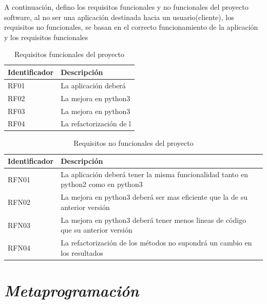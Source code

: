 \documentclass{cosas/tfg_domingo}
\begin{document}
A continuación, defino los requisitos funcionales y no funcionales del proyecto software, al no ser una aplicación destinada hacia un usuario(cliente), los requisitos no funcionales, se basan en el correcto funcionamiento de la aplicación y los requisitos funcionales

\begin{table}[h]
\centering
\begin{tabular}{|l|l|}
\hline
Identificador & Descripción                     \\ \hline
RF01         & La aplicación deberá            \\ \hline
RF02         & La mejora en python3            \\ \hline
RF03         & La mejora en python3            \\ \hline
RF04         & La refactorización de l         \\ \hline
\end{tabular}
\caption{Requisitos funcionales del proyecto}
\label{tab:my-table}
\end{table}

\begin{table}[h]
\centering
\begin{tabular}{|l|l|}
\hline
Identificador & Descripción                              \\ \hline
RFN01         & La aplicación deberá tener la misma funcionalidad tanto en python2 como en python3                                          \\ \hline
RFN02          & La mejora en python3 deberá ser mas eficiente que la de su anterior versión                                                  \\ \hline
RFN03          & La mejora en python3 deberá tener menos lineas de código que su anterior versión                                         \\ \hline
RFN04          & La refactorización de los métodos no supondrá un cambio en los resultados                                               \\ \hline
\end{tabular}
\caption{Requisitos no funcionales del proyecto}
\label{tab:my-table}
\end{table}

\newpage

\chapter{\emph{Metaprogramación}}
\end{document}
